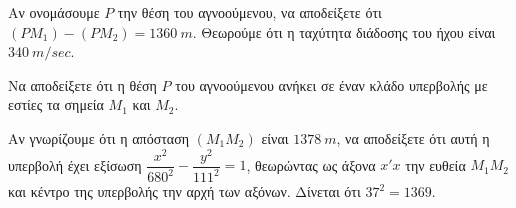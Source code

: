 \begin{alist}
    \item Αν ονομάσουμε $P$ την θέση του αγνοούμενου, να αποδείξετε ότι $(PM_1) - (PM_2) = 1360 \ m$. Θεωρούμε ότι η ταχύτητα διάδοσης του ήχου είναι $340 \ m/sec$. 
    \item Να αποδείξετε ότι η θέση $P$ του αγνοούμενου ανήκει σε έναν κλάδο υπερβολής με εστίες τα σημεία $M_1$ και $M_2$. 
    \item Αν γνωρίζουμε ότι η απόσταση $(M_1 M_2)$ είναι $1378 \ m$, να αποδείξετε ότι αυτή η υπερβολή έχει εξίσωση $\dfrac{x^2}{680^2} - \dfrac{y^2}{111^2} = 1$, θεωρώντας ως άξονα $x'x$ την ευθεία $M_1 M_2$ και κέντρο της υπερβολής την αρχή των αξόνων. Δίνεται ότι $37^2 = 1369$. 
\end{alist}